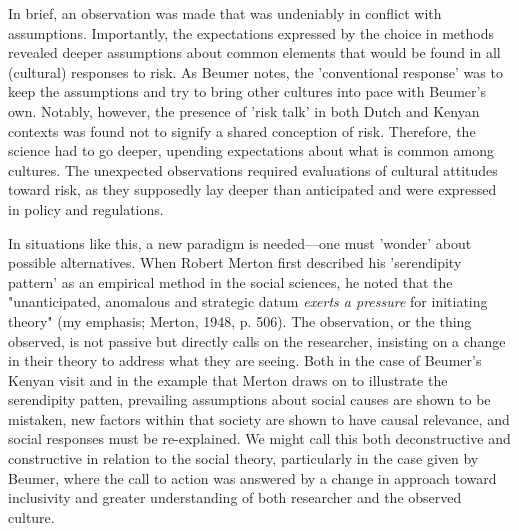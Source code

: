 \documentclass[authordate, empirical]{jote-new-article}
\begin{document}
	In brief, an observation was made that was undeniably in conflict with assumptions. Importantly, the expectations expressed by the choice in methods revealed deeper assumptions about common elements that would be found in all (cultural) responses to risk. As Beumer notes, the 'conventional response' was to keep the assumptions and try to bring other cultures into pace with Beumer's own. Notably, however, the presence of 'risk talk' in both Dutch and Kenyan contexts was found not to signify a shared conception of risk. Therefore, the science had to go deeper, upending expectations about what is common among cultures. The unexpected observations required evaluations of cultural attitudes toward risk, as they supposedly lay deeper than anticipated and were expressed in policy and regulations.



	In situations like this, a new paradigm is needed—one must 'wonder' about possible alternatives. When Robert Merton first described his 'serendipity pattern' as an empirical method in the social sciences, he noted that the "unanticipated, anomalous and strategic datum \emph{exerts a pressure }for initiating theory" (my emphasis; Merton, 1948, p. 506). The observation, or the thing observed, is not passive but directly calls on the researcher, insisting on a change in their theory to address what they are seeing. Both in the case of Beumer's Kenyan visit and in the example that Merton draws on to illustrate the serendipity patten, prevailing assumptions about social causes are shown to be mistaken, new factors within that society are shown to have causal relevance, and social responses must be re-explained. We might call this both deconstructive and constructive in relation to the social theory, particularly in the case given by Beumer, where the call to action was answered by a change in approach toward inclusivity and greater understanding of both researcher and the observed culture.
\end{document}
